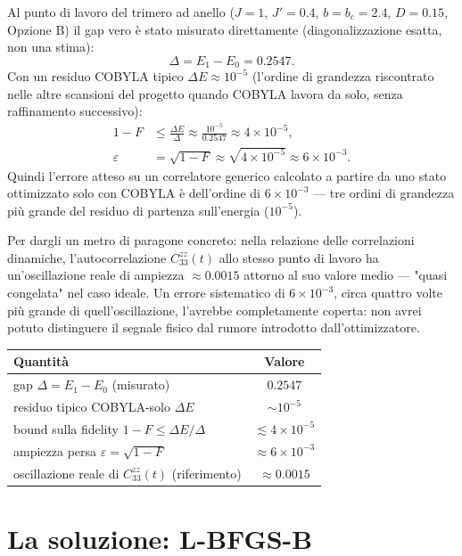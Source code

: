 \documentclass[11pt,a4paper]{article}
\begin{document}
Al punto di lavoro del trimero ad anello ($J=1$, $J'=0.4$, $b=b_c=2.4$, $D=0.15$, Opzione B) il gap vero è stato misurato direttamente (diagonalizzazione esatta, non una stima):
\[
\Delta = E_1-E_0 = 0.2547.
\]
Con un residuo COBYLA tipico $\Delta E\approx10^{-5}$ (l'ordine di grandezza riscontrato nelle altre scansioni del progetto quando COBYLA lavora da solo, senza raffinamento successivo):
\begin{align}
1-F &\le \frac{\Delta E}{\Delta} \approx \frac{10^{-5}}{0.2547} \approx 4\times10^{-5},\\
\varepsilon &= \sqrt{1-F} \approx \sqrt{4\times10^{-5}} \approx 6\times10^{-3}.
\end{align}
Quindi l'errore atteso su un correlatore generico calcolato a partire da uno stato ottimizzato solo con COBYLA è dell'ordine di $6\times10^{-3}$ — tre ordini di grandezza più grande del residuo di partenza sull'energia ($10^{-5}$).

Per dargli un metro di paragone concreto: nella relazione delle correlazioni dinamiche, l'autocorrelazione $C_{33}^{zz}(t)$ allo stesso punto di lavoro ha un'oscillazione reale di ampiezza $\approx0.0015$ attorno al suo valore medio — "quasi congelata" nel caso ideale. Un errore sistematico di $6\times10^{-3}$, circa quattro volte più grande di quell'oscillazione, l'avrebbe completamente coperta: non avrei potuto distinguere il segnale fisico dal rumore introdotto dall'ottimizzatore.

\begin{center}
\renewcommand{\arraystretch}{1.3}
\begin{tabular}{@{}lc@{}}
\toprule
\textbf{Quantità} & \textbf{Valore}\\
\midrule
gap $\Delta=E_1-E_0$ (misurato) & $0.2547$\\
residuo tipico COBYLA-solo $\Delta E$ & $\sim10^{-5}$\\
bound sulla fidelity $1-F\le\Delta E/\Delta$ & $\lesssim4\times10^{-5}$\\
ampiezza persa $\varepsilon=\sqrt{1-F}$ & $\approx6\times10^{-3}$\\
oscillazione reale di $C_{33}^{zz}(t)$ (riferimento) & $\approx0.0015$\\
\bottomrule
\end{tabular}
\end{center}

\section{La soluzione: L-BFGS-B}
\end{document}
